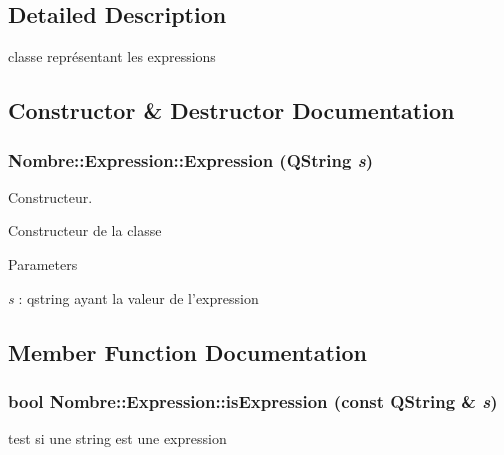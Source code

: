 \subsection{Detailed Description}
classe représentant les expressions 

\subsection{Constructor \& Destructor Documentation}
\hypertarget{classNombre_1_1Expression_ab2b7ef803e791d6c91bcca2ee962176b}{
\subsubsection[{Expression}]{\setlength{\rightskip}{0pt plus 5cm}Nombre::Expression::Expression (QString {\em s})}}
\label{classNombre_1_1Expression_ab2b7ef803e791d6c91bcca2ee962176b}


Constructeur. 

Constructeur de la classe


\begin{DoxyParams}{Parameters}
\item[{\em s}]: qstring ayant la valeur de l'expression \end{DoxyParams}


\subsection{Member Function Documentation}
\hypertarget{classNombre_1_1Expression_a328706688b501e287257035d4eef3584}{
\subsubsection[{isExpression}]{\setlength{\rightskip}{0pt plus 5cm}bool Nombre::Expression::isExpression (const QString \& {\em s})}}
\label{classNombre_1_1Expression_a328706688b501e287257035d4eef3584}


test si une string est une expression 


